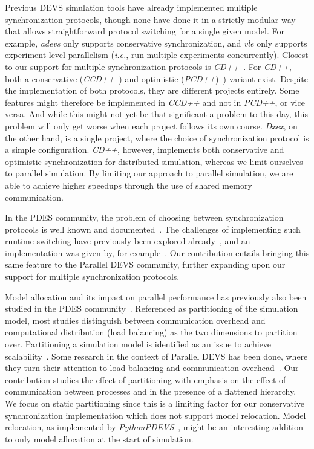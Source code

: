 Previous \textsf{DEVS} simulation tools have already implemented multiple synchronization protocols, though none have done it in a strictly modular way that allows straightforward protocol switching for a single given model.
For example, \textit{adevs} only supports conservative synchronization, and \textit{vle} only supports experiment-level parallelism (\textit{i.e.}, run multiple experiments concurrently).
Closest to our support for multiple synchronization protocols is \textit{CD++}~\cite{CD++}.
For \textit{CD++}, both a conservative (\textit{CCD++}~\cite{CCD++}) and optimistic (\textit{PCD++})~\cite{PCD++}) variant exist.
Despite the implementation of both protocols, they are different projects entirely.
Some features might therefore be implemented in \textit{CCD++} and not in \textit{PCD++}, or vice versa.
And while this might not yet be that significant a problem to this day, this problem will only get worse when each project follows its own course.
\textit{Dxex}, on the other hand, is a single project, where the choice of synchronization protocol is a simple configuration.
\textit{CD++}, however, implements both conservative and optimistic synchronization for distributed simulation, whereas we limit ourselves to parallel simulation.
By limiting our approach to parallel simulation, we are able to achieve higher speedups through the use of shared memory communication.

In the \textsf{PDES} community, the problem of choosing between synchronization protocols is well known and documented~\cite{Jha:1994:UFC:195291.182480}.
The challenges of implementing such runtime switching have previously been explored already~\cite{Das:1996:APP:256562.256602}, and an implementation was given by, for example~\cite{perumalla2005musik}.
Our contribution entails bringing this same feature to the \textsf{Parallel DEVS} community, further expanding upon our support for multiple synchronization protocols.

Model allocation and its impact on parallel performance has previously also been studied in the \textsf{PDES} community~\cite{PDESpartitioning}.
Referenced as partitioning of the simulation model, most studies distinguish between communication overhead and computational distribution (load balancing) as the two dimensions to partition over.
Partitioning a simulation model is identified as an issue to achieve scalability~\cite{Scalability}. 
Some research in the context of \textsf{Parallel DEVS} has been done, where they turn their attention to load balancing and communication overhead~\cite{PDEVSpartitioning}.
Our contribution studies the effect of partitioning with emphasis on the effect of communication between processes and in the presence of a flattened hierarchy. 
We focus on static partitioning since this is a limiting factor for our conservative synchronization implementation which does not support model relocation.
Model relocation, as implemented by \textit{PythonPDEVS}~\cite{PythonPDEVS2}, might be an interesting addition to only model allocation at the start of simulation.

